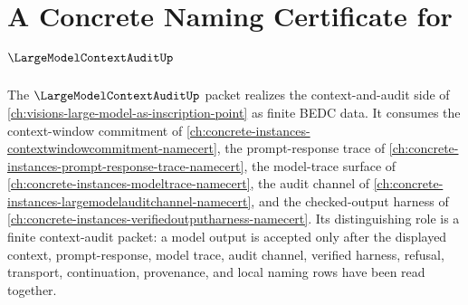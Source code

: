\chapter{A Concrete Naming Certificate for $\LargeModelContextAuditUp$}
\label{ch:concrete-instances-largemodelcontextaudit-namecert}

The $\LargeModelContextAuditUp$ packet realizes the context-and-audit side of \autoref{ch:visions-large-model-as-inscription-point} as finite BEDC data. It consumes the context-window commitment of \autoref{ch:concrete-instances-contextwindowcommitment-namecert}, the prompt-response trace of \autoref{ch:concrete-instances-prompt-response-trace-namecert}, the model-trace surface of \autoref{ch:concrete-instances-modeltrace-namecert}, the audit channel of \autoref{ch:concrete-instances-largemodelauditchannel-namecert}, and the checked-output harness of \autoref{ch:concrete-instances-verifiedoutputharness-namecert}. Its distinguishing role is a finite context-audit packet: a model output is accepted only after the displayed context, prompt-response, model trace, audit channel, verified harness, refusal, transport, continuation, provenance, and local naming rows have been read together.

